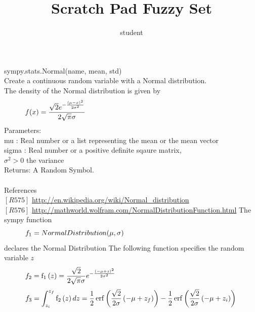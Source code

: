 \documentclass[10pt,a4paper]{article}
\author{student}
\title{Scratch Pad Fuzzy Set}
\begin{document}
\maketitle

\noindent sympy.stats.Normal(name, mean, std) \\ Create a continuous random variable with a Normal distribution. \\ The density of the Normal distribution is given by 
\begin{equation}
\begin{minipage}{300pt}
 $\displaystyle f{\left (x \right )} = \frac{\sqrt{2} e^{- \frac{\left(\mu - x\right)^{2}}{2 \sigma^{2}}}}{2 \sqrt{\pi} \sigma}$  
\end{minipage}
\end{equation}
\noindent Parameters:	\\ mu    : Real number or a list representing the mean or the mean vector \\ sigma : Real number or a positive definite sqaure matrix, \\ $\sigma^{2} > 0 $ the variance \\ Returns: A Random Symbol.  \\ \\ References  \\ $[R575]$	\url{http://en.wikipedia.org/wiki/Normal_distribution}  \\ $[R576]$	\url{http://mathworld.wolfram.com/NormalDistributionFunction.html}
\noindent The sympy function 
\begin{equation}
\begin{minipage}{300pt}
 $\displaystyle f_{1} = NormalDistribution(\mu, \sigma)$  
\end{minipage}
\end{equation}
\noindent declares the Normal Distribution 
\noindent The following function specifies the random variable $z$
\begin{equation}
\begin{minipage}{300pt}
 $\displaystyle f_{2} = \operatorname{f_{1}}{\left (z \right )} = \frac{\sqrt{2}}{2 \sqrt{\pi} \sigma} e^{- \frac{\left(- \mu + z\right)^{2}}{2 \sigma^{2}}}$  
\end{minipage}
\end{equation}
\begin{equation}
\begin{minipage}{300pt}
 $\displaystyle f_{3} = \int_{z_{i}}^{z_{f}} \operatorname{f_{2}}{\left (z \right )}\, dz = \frac{1}{2} \operatorname{erf}{\left (\frac{\sqrt{2}}{2 \sigma} \left(- \mu + z_{f}\right) \right )} - \frac{1}{2} \operatorname{erf}{\left (\frac{\sqrt{2}}{2 \sigma} \left(- \mu + z_{i}\right) \right )}$  
\end{minipage}
\end{equation}
\end{document}
